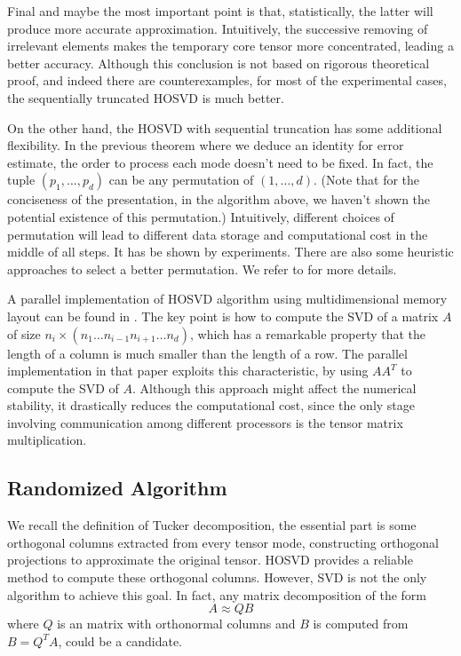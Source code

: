 \documentclass[12pt]{article}
\begin{document}
Final and maybe the most important point is that, statistically, the latter will produce more accurate approximation. Intuitively, the successive removing of irrelevant elements makes the temporary core tensor more concentrated, leading a better accuracy. Although this conclusion is not based on rigorous theoretical proof, and indeed there are counterexamples, for most of the experimental cases, the sequentially truncated HOSVD is much better. 

On the other hand, the HOSVD with sequential truncation has some additional flexibility. In the previous theorem where we deduce an identity for error estimate, the order to process each mode doesn't need to be fixed. In fact, the tuple $(p_1, \dots, p_d)$ can be any permutation of $(1, \dots, d)$. (Note that for the conciseness of the presentation, in the algorithm above, we haven't shown the potential existence of this permutation.) Intuitively, different choices of permutation will lead to different data storage and computational cost in the middle of all steps. It has be shown by experiments. There are also some heuristic approaches to select a better permutation. We refer to \cite{trunctucker} for more details.

A parallel implementation of HOSVD algorithm using multidimensional memory layout can be found in \cite{koldapara}. The key point is how to compute the SVD of a matrix $A$ of size
$n_i \times (n_1 \dots n_{i-1} n_{i+1} \dots n_d)$, which has a remarkable property that the length of a column is much smaller than the length of a row. The parallel implementation in that paper exploits this characteristic, by using $AA^T$ to compute the SVD of $A$. Although this approach might affect the numerical stability, it drastically reduces the computational cost, since the only stage involving communication among different processors is the tensor matrix multiplication.

\subsection{Randomized Algorithm}
We recall the definition of Tucker decomposition, the essential part is some orthogonal columns extracted from every tensor mode, constructing orthogonal projections to approximate the original tensor. HOSVD provides a reliable method to compute these orthogonal columns. However, SVD is not the only algorithm to achieve this goal. In fact, any matrix decomposition of the form 
$$ A \approx QB$$
where $Q$ is an matrix with orthonormal columns and $B$ is computed from $B = Q^TA$, could be a candidate. 
\end{document}
